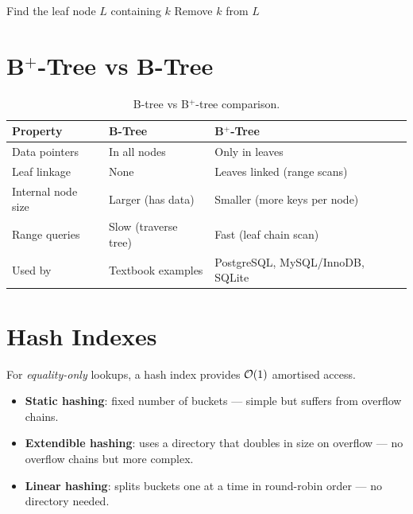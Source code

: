 \begin{algorithm}[H]
\caption{B-Tree Deletion (simplified)}
\label{alg:btree-delete}
Find the leaf node $L$ containing $k$\;
Remove $k$ from $L$\;
\end{algorithm}

\section{B$^+$-Tree vs B-Tree}

\begin{table}[H]
\centering
\caption{B-tree vs B$^+$-tree comparison.}
\label{tab:btree-vs-bplus}
\begin{tabular}{l p{6cm} p{6cm}}
\toprule
\textbf{Property} & \textbf{B-Tree} & \textbf{B$^+$-Tree} \\
\midrule
Data pointers      & In all nodes      & Only in leaves \\
Leaf linkage       & None              & Leaves linked (range scans) \\
Internal node size & Larger (has data) & Smaller (more keys per node) \\
Range queries      & Slow (traverse tree) & Fast (leaf chain scan) \\
Used by            & Textbook examples  & PostgreSQL, MySQL/InnoDB, SQLite \\
\bottomrule
\end{tabular}
\end{table}

\section{Hash Indexes}
\label{sec:hash-index}

For \emph{equality-only} lookups, a hash index provides $\mathcal{O}(1)$ amortised access.

\begin{conceptbox}
\begin{itemize}[nosep]
  \item \textbf{Static hashing}: fixed number of buckets --- simple but suffers from overflow chains.
  \item \textbf{Extendible hashing}: uses a directory that doubles in size on overflow --- no overflow chains but more complex.
  \item \textbf{Linear hashing}: splits buckets one at a time in round-robin order --- no directory needed.
\end{itemize}
\end{conceptbox}

